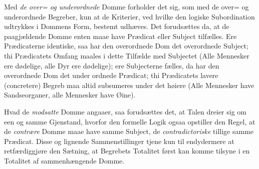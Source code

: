 \documentclass[12pt]{book}
\newcommand{\opage}[1]{\marginnote{\footnotesize\textit{[#1]}}}
\begin{document}
Med \emph{de over= og underordnede} Domme forholder det sig, som med de over= og
underordnede Begreber, kun at de Kriterier, ved hvilke den logiske Subordination
udtrykkes i Dommens Form, bestemt udhæves. Det forudsættes da, at de paagjældende
Domme enten maae have Prædicat eller Subject tilfælles. Ere Prædicaterne
identiske, saa har den overordnede Dom det overordnede Subject; thi Prædicatets
Omfang maales i dette Tilfælde med Subjectet (Alle Mennesker ere dødelige, alle
Dyr ere dødelige); ere Subjecterne fælles, da har den overordnede Dom det under%
\opage{60}ordnede Prædicat; thi Prædicatets lavere (concretere) Begreb maa altid subsumeres
under det høiere (Alle Mennesker have Sandseorganer, alle Mennesker have Øine).

Hvad de \emph{modsatte} Domme angaaer, saa forudsættes det, at Talen dreier sig om
een og samme Gjenstand, hvorfor den formelle Logik ogsaa opstiller den Regel, at
de \emph{contrære} Domme maae have samme Subject, de \emph{contradictoriske}
tillige samme Prædicat. Disse og lignende Sammenstillinger tjene kun til
endydermere at retfærdiggjøre den Sætning, at Begrebets Totalitet først kan komme
tilsyne i en Totalitet af sammenhængende Domme.
\end{document}

